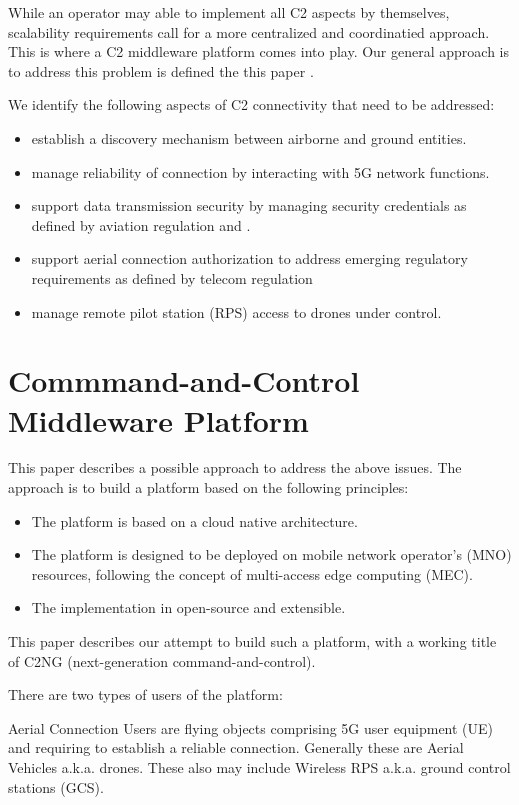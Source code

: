 \documentclass[a4paper,conference]{IEEEtran}
\begin{document}
While an operator may able to implement all C2 aspects by themselves, scalability requirements call for a more centralized and coordinatied approach. This is where a C2 middleware platform comes into play. Our general approach is to address this problem is defined the this paper \cite{uai}.

We identify the following aspects of C2 connectivity that need to be addressed:

\begin{itemize}
\item establish a discovery mechanism between airborne and ground entities.
\item manage reliability of connection by interacting with 5G network functions.
\item support data transmission security by managing security credentials as defined by aviation regulation \cite{icao:annex10VI} and \cite{rtca:do377a}.
\item support aerial connection authorization to address emerging regulatory requirements as defined by telecom regulation \cite{3gpp:uuaa}
\item manage remote pilot station (RPS) access to drones under control.
\end{itemize}

\section{Commmand-and-Control Middleware Platform}

This paper describes a possible approach to address the above issues. The approach is to build a platform based on the following principles:

\begin{itemize}
\item The platform is based on a cloud native architecture.
\item The platform is designed to be deployed on mobile network operator's (MNO) resources, following the concept of multi-access edge computing (MEC).
\item The implementation in open-source and extensible.
\end{itemize}

This paper describes our attempt to build such a platform, with a working title of C2NG (next-generation command-and-control).

There are two types of users of the platform:

Aerial Connection Users are flying objects comprising 5G user equipment (UE) and requiring to establish a reliable connection. Generally these are Aerial Vehicles a.k.a. drones. These also may include Wireless RPS a.k.a. ground control stations (GCS).
\end{document}
